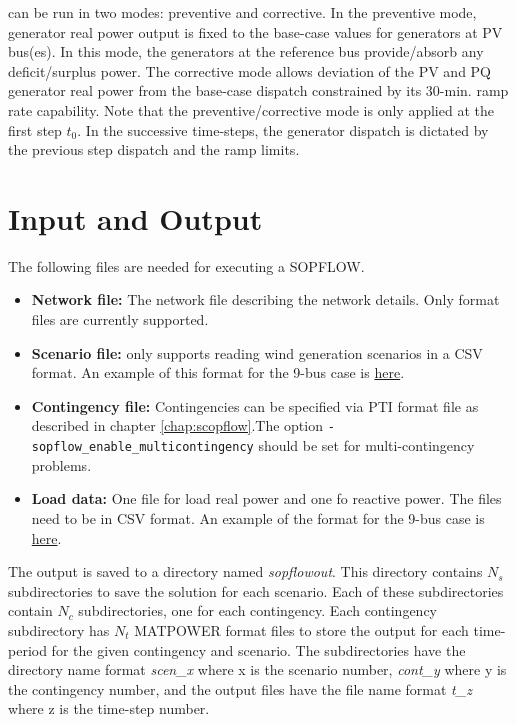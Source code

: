 \sopflow can be run in two modes: preventive and corrective. In the preventive mode, generator real power output is fixed to the base-case values for generators at PV bus(es). In this mode, the generators at the reference bus provide/absorb any deficit/surplus power. The corrective mode allows deviation of the PV and PQ generator real power from the base-case dispatch constrained by its 30-min. ramp rate capability. Note that the preventive/corrective mode is only applied at the first step $t_0$. In the successive time-steps, the generator dispatch is dictated by the previous step dispatch and the ramp limits.

\section{Input and Output}
The following files are needed for executing a SOPFLOW.
\begin{itemize}
    \item \textbf{Network file:} The network file describing the network details. Only \matpower format files are currently supported.
    \item \textbf{Scenario file:} \sopflow only supports reading wind generation scenarios in a CSV format. An example of this format for the 9-bus case is \href{https://gitlab.pnnl.gov/exasgd/frameworks/exago/-/tree/master/datafiles/case9/scenarios.csv}{here}.
    \item \textbf{Contingency file:} Contingencies can be specified via PTI format file as described in chapter \ref{chap:scopflow}.The option \lstinline{-sopflow_enable_multicontingency} should be set for multi-contingency problems.
    \item \textbf{Load data:} One file for load real power and one fo reactive power. The files need to be in CSV format. An example of the format for the 9-bus case is \href{https://gitlab.pnnl.gov/exasgd/frameworks/exago/-/tree/master/datafiles/case9}{here}.
\end{itemize}

The \sopflow output is saved to a directory named \emph{sopflowout}. This directory contains $N_s$ subdirectories to save the solution for each scenario. Each of these subdirectories contain $N_c$ subdirectories, one for each contingency. Each contingency subdirectory has $N_t$ MATPOWER format files to store the output for each time-period for the given contingency and scenario. The subdirectories have the directory name format \emph{scen\_x} where x is the scenario number,  \emph{cont\_y} where y is the contingency number, and the output files have the file name format \emph{t\_z} where z is the time-step number.

